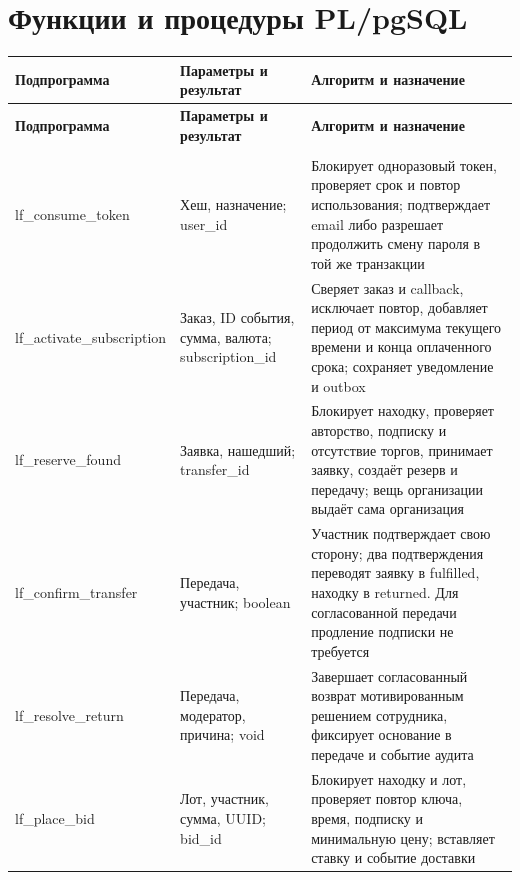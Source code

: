 \clearpage
\section{Функции и процедуры PL/\allowbreak{}pg\allowbreak{}SQL}

\begingroup
{}
\fontsize{11}{13}\selectfont
\setlength{\tablecontentwidth}{\dimexpr\linewidth-6\tabcolsep-4\arrayrulewidth\relax}
\begin{longtable}{|>{\RaggedRight\arraybackslash}p{0.30\tablecontentwidth}|>{\RaggedRight\arraybackslash}p{0.35\tablecontentwidth}|>{\RaggedRight\arraybackslash}p{0.35\tablecontentwidth}|}
\hline
\textbf{Подпрограмма} & \textbf{Параметры и результат} & \textbf{Алгоритм и назначение} \\ \hline
\endfirsthead
\textbf{Подпрограмма} & \textbf{Параметры и результат} & \textbf{Алгоритм и назначение} \\ \hline
\endhead
\multicolumn{3}{r}{\footnotesize Продолжение на следующей странице} \\
\endfoot
\endlastfoot
lf\_\allowbreak{}consume\_\allowbreak{}token & Хеш, назначение; user\_\allowbreak{}id & Блокирует одноразовый токен, проверяет срок и повтор использования; подтверждает email либо разрешает продолжить смену пароля в той же транзакции \\ \hline
lf\_\allowbreak{}activate\_\allowbreak{}subscription & Заказ, ID события, сумма, валюта; subscription\_\allowbreak{}id & Сверяет заказ и callback, исключает повтор, добавляет период от максимума текущего времени и конца оплаченного срока; сохраняет уведомление и outbox \\ \hline
lf\_\allowbreak{}reserve\_\allowbreak{}found & Заявка, нашедший; transfer\_\allowbreak{}id & Блокирует находку, проверяет авторство, подписку и отсутствие торгов, принимает заявку, создаёт резерв и передачу; вещь организации выдаёт сама организация \\ \hline
lf\_\allowbreak{}confirm\_\allowbreak{}transfer & Передача, участник; boolean & Участник подтверждает свою сторону; два подтверждения переводят заявку в fulfilled, находку в returned. Для согласованной передачи продление подписки не требуется \\ \hline
lf\_\allowbreak{}resolve\_\allowbreak{}return & Передача, модератор, причина; void & Завершает согласованный возврат мотивированным решением сотрудника, фиксирует основание в передаче и событие аудита \\ \hline
lf\_\allowbreak{}place\_\allowbreak{}bid & Лот, участник, сумма, UUID; bid\_\allowbreak{}id & Блокирует находку и лот, проверяет повтор ключа, время, подписку и минимальную цену; вставляет ставку и событие доставки \\ \hline

\end{longtable}
